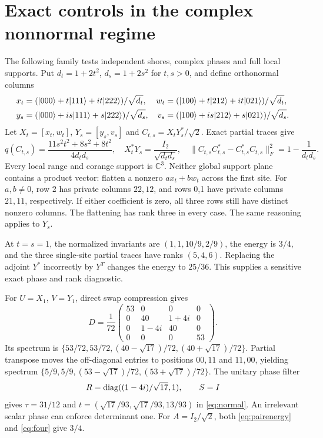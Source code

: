 \documentclass[11pt,a4paper]{article}
\theoremstyle{definition}\newtheorem{definition}[theorem]{Definition}
\theoremstyle{remark}\newtheorem{remark}[theorem]{Remark}
\newcommand{\C}{\mathbb C}\newcommand{\R}{\mathbb R}
\newcommand{\ket}[1]{|#1\rangle}\newcommand{\bra}[1]{\langle#1|}
\numberwithin{equation}{section}
\begin{document}
\section{Exact controls in the complex nonnormal regime}\label{sec:controls}
The following family tests independent shores, complex phases and
full local supports. Put $d_t=1+2t^2$, $d_s=1+2s^2$ for $t,s>0$,
and define orthonormal columns
\begin{align}
x_t&=(\ket{000}+t\ket{111}+it\ket{222})/\sqrt{d_t},&
w_t&=(\ket{100}+t\ket{212}+it\ket{021})/\sqrt{d_t},\notag\\
y_s&=(\ket{000}+is\ket{111}+s\ket{222})/\sqrt{d_s},&
v_s&=(\ket{100}+is\ket{212}+s\ket{021})/\sqrt{d_s}.
\label{eq:family}
\end{align}
Let $X_t=[x_t,w_t]$, $Y_s=[y_s,v_s]$ and $C_{t,s}=X_tY_s^*/\sqrt2$.
Exact partial traces give
\begin{equation}
q(C_{t,s})=\frac{11s^2t^2+8s^2+8t^2}{4d_td_s},\quad
X_t^*Y_s=\frac{I_2}{\sqrt{d_td_s}},\quad
\|C_{t,s}C_{t,s}^*-C_{t,s}^*C_{t,s}\|_F^2
=1-\frac1{d_td_s}.
\label{eq:familyenergy}
\end{equation}
Every local range and corange support is $\C^3$.
Neither global support plane contains a product vector:
flatten a nonzero $a x_t+b w_t$ across the first site.
For $a,b\ne0$, row 2 has private columns $22,12$, and rows 0,1
have private columns $21,11$, respectively.
If either coefficient is zero, all three rows still have distinct
nonzero columns. The flattening has rank three in every case.
The same reasoning applies to $Y_s$.

At $t=s=1$, the normalized invariants are $(1,1,10/9,2/9)$,
the energy is $3/4$, and the three single-site partial traces have
ranks $(5,4,6)$. Replacing the adjoint $Y^*$ incorrectly by $Y^T$
changes the energy to $25/36$. This supplies a sensitive exact
phase and rank diagnostic.

For $U=X_1$, $V=Y_1$, direct swap compression gives
\begin{equation}
D=\frac1{72}
\begin{pmatrix}
53&0&0&0\\
0&40&1+4i&0\\
0&1-4i&40&0\\
0&0&0&53
\end{pmatrix}.
\label{eq:complexD}
\end{equation}
Its spectrum is
$\{53/72,53/72,(40-\sqrt{17})/72,(40+\sqrt{17})/72\}$.
Partial transpose moves the off-diagonal entries to positions
$00,11$ and $11,00$, yielding spectrum
$\{5/9,5/9,(53-\sqrt{17})/72,(53+\sqrt{17})/72\}$.
The unitary phase filter
\[
R=\operatorname{diag}((1-4i)/\sqrt{17},1),\qquad S=I
\]
gives $\tau=31/12$ and
$t=(\sqrt{17}/93,\sqrt{17}/93,13/93)$ in \eqref{eq:normal}.
An irrelevant scalar phase can enforce determinant one.
For $A=I_2/\sqrt2$, both \eqref{eq:pairenergy} and \eqref{eq:four}
give $3/4$.
\end{document}
